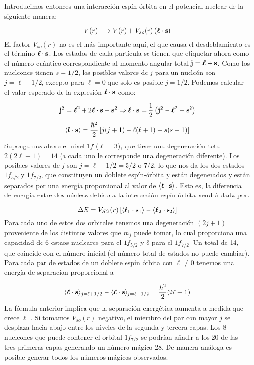 Introducimos entonces una interacción espín-órbita en el potencial nuclear de la siguiente manera:

\begin{equation}
    V(r) \longrightarrow V(r) + V_{so} (r) \left( \boldsymbol{\ell} \cdot \mathbf{s} \right)
\end{equation}
El factor $V_{so} (r)$ no es el más importante aquí, el que causa el desdoblamiento es el término $\boldsymbol{\ell}\cdot\mathbf{s}$. Los estados de cada partícula se tienen que etiquetar ahora como el número cuántico correspondiente al momento angular total $\mathbf{j} =\boldsymbol{\ell}+\mathbf{s}$. Como los nucleones tienen $s=1/2$, los posibles valores de $j$ para un nucleón son $j=\ell\pm 1/2$, excepto para $\ell=0$ que solo es posible $j=1/2$. Podemos calcular el valor esperado de la expresión $\boldsymbol{\ell} \cdot \mathbf{s}$ como:

\begin{equation}
    \mathbf{j}^2 = \boldsymbol{\ell}^2 + 2 \boldsymbol{\ell}\cdot\mathbf{s} + \mathbf{s}^2 \Rightarrow \boldsymbol{\ell} \cdot \mathbf{s} = \frac{1}{2} \left( \mathbf{j}^2 -\boldsymbol{\ell}^2 -\mathbf{s}^2 \right)     
\end{equation}
\begin{equation}
    \langle \boldsymbol{l} \cdot \mathbf{s} \rangle = \frac{\hbar^2}{2} \left[ j(j+1)-\ell(\ell+1) - s(s-1) \right]
\end{equation}
Supongamos ahora el nivel $1f$ ($\ell = 3$), que tiene una degeneración total $2(2\ell+1)=14$ (a cada uno le corresponde una degeneración diferente). Los posibles valores de $j$ son $j=\ell \pm 1/2=5/2$ o $7/2$, lo que nos da los dos estados $1f_{5/2}$ y $1f_{7/2}$, que constituyen un doblete espín-órbita y están degenerados y están separados por una energía proporcional al valor de $\langle \boldsymbol{\ell} \cdot \mathbf{s} \rangle$. Esto es, la diferencia de energía entre dos núcleos debido a la interacción espín órbita vendrá dada por:

\begin{equation}
	\Delta E = V_{SO} (r) \left[ \langle \boldsymbol{\ell}_1 \cdot \mathbf{s}_1 \rangle - \langle \boldsymbol{\ell}_2 \cdot \mathbf{s}_2 \rangle \right]
\end{equation}
Para cada uno de estos dos orbitales tenemos una degeneración $(2j+1)$ proveniente de los distintos valores que $m_j$ puede tomar, lo cual proporciona una capacidad de 6 estaos nucleares para el $1f_{5/2}$ y 8 para el $1f_{7/2}$. Un total de 14, que coincide con el número inicial (el número total de estados no puede cambiar). Para cada par de estados de un doblete espín órbita con $\ell \neq 0$ tenemos una energía de separación proporcional a

\begin{equation}
	\langle \boldsymbol{\ell} \cdot \mathbf{s} \rangle_{j=\ell+1/2} - \langle \boldsymbol{\ell} \cdot \mathbf{s} \rangle_{j=\ell-1/2} = \frac{\hbar^2}{2} (2\ell +1)
\end{equation}
La fórmula anterior implica que la separación energética aumenta a medida que crece $\ell$ . Si tomamos $V_{so} (r)$ negativo, el miembro del par con mayor $j$ se desplaza hacia abajo entre los niveles de la segunda y tercera capas. Los 8 nucleones que puede contener el orbital $1f_{7/2}$ se podrían añadir a los 20 de las tres primeras capas generando un número mágico 28. De manera análoga es posible generar todos los números mágicos observados. 

